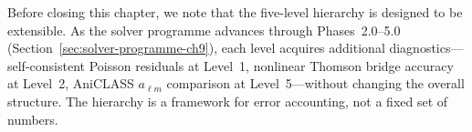 Before closing this chapter, we note that the five-level
hierarchy is designed to be extensible.  As the solver
programme advances through Phases~2.0--5.0
(Section~\ref{sec:solver-programme-ch9}), each level
acquires additional diagnostics---self-consistent
Poisson residuals at Level~1, nonlinear Thomson bridge
accuracy at Level~2, AniCLASS $a_{\ell m}$ comparison
at Level~5---without changing the overall structure.
The hierarchy is a framework for error accounting, not a
fixed set of numbers.


